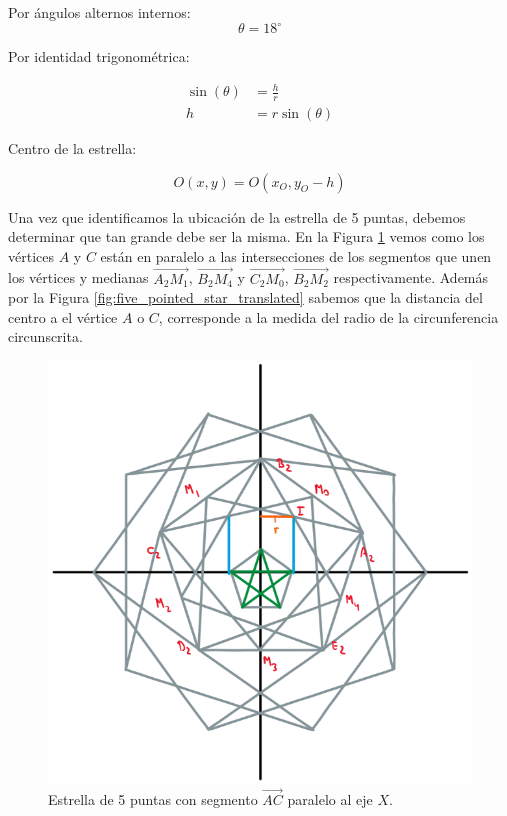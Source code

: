 \documentclass[oneside, a4paper]{article}
\begin{document}
            Por ángulos alternos internos:
            \begin{equation*}
                \theta = 18^{\circ}
            \end{equation*}

            Por identidad trigonométrica:

            \begin{align}
                \sin(\theta) & = \frac{h}{r} \nonumber                           \\
                h            & = {r}\sin(\theta) \label{eq:vertical_translation}
            \end{align}

            Centro de la estrella:

            \begin{equation}
                O(x, y) = O(x_{O}, y_{O} - h)
                \label{eq:five_pointed_star_center}
            \end{equation}

            Una vez que identificamos la ubicación de la estrella de 5 puntas, debemos determinar que tan grande debe ser la misma. En la Figura \ref{fig:five_pointed_star_center} vemos como los vértices $A$ y $C$ están en paralelo a las intersecciones de los segmentos que unen los vértices y medianas $\overrightarrow{A_{2}M_{1}}$, $\overrightarrow{B_{2}M_{4}}$ y $\overrightarrow{C_{2}M_{0}}$, $\overrightarrow{B_{2}M_{2}}$ respectivamente. Además por la Figura \ref{fig:five_pointed_star_translated} sabemos que la distancia del centro a el vértice $A$ o $C$, corresponde a la medida del radio de la circunferencia circunscrita.

            \begin{figure}[H]
                \centering
                \includegraphics[scale=0.5]{five_pointed_star_center.png}
                \caption{Estrella de 5 puntas con segmento $\overrightarrow{AC}$ paralelo al eje $X$.}
                \label{fig:five_pointed_star_center}
            \end{figure}
\end{document}
